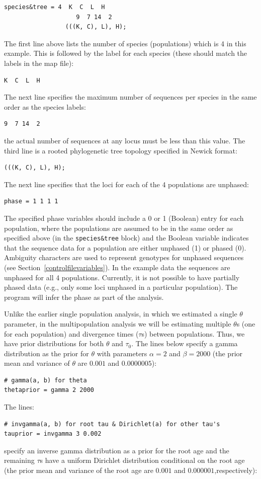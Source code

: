 \documentclass[a4paper]{book}
\numberwithin{equation}{section} \renewcommand{\baselinestretch}{0.55}
\begin{document}
\begin{verbatim}
species&tree = 4  K  C  L  H
                    9  7 14  2
                 (((K, C), L), H);
\end{verbatim}

\noindent
The first line above lists the number of species (populations) which is
4 in this example. This is followed
by the label for each species (these should match the labels in the map
file):
\begin{verbatim}
K  C  L  H
\end{verbatim}
The next line specifies the maximum number of sequences per
species in the same order as the species labels:
\begin{verbatim}
9  7 14  2
\end{verbatim}
the actual number of sequences at any locus must be less than this value.
The third line is a rooted phylogenetic tree topology specified in
Newick format:
\begin{verbatim}
(((K, C), L), H);
\end{verbatim}
The next line specifies that the loci for each of the 4 populations
are unphased:
\begin{verbatim}
phase = 1 1 1 1
\end{verbatim}
The specified phase variables should include a 0 or 1 (Boolean) entry for each population, 
where the populations are assumed to be in the same order as specified above
(in the \texttt{species\&tree} block)
and the Boolean variable indicates that the sequence data for a population
are either unphased (1) or phased (0). Ambiguity characters are used to represent
genotypes for unphased sequences (see Section~\ref{controlfilevariables}).
In the example data the sequences are unphased for all 4 populations.
Currently, it is not possible to have partially phased data (e.g., only
some loci unphased in a particular population). The program will infer
the phase as part of the analysis.

Unlike the earlier single population analysis, in which we estimated a
single $\theta$ parameter, in the multipopulation analysis we will be
estimating multiple $\theta$s (one for each population) and divergence
times ($\tau$s) between populations. Thus, we have prior distributions
for both $\theta$ and $\tau_0$. The lines below specify a gamma distribution
as the prior for $\theta$ with parameters $\alpha = 2$ and $\beta = 2000$
(the prior mean and variance of $\theta$ are $0.001$ and $0.0000005$):
\begin{verbatim}
# gamma(a, b) for theta
thetaprior = gamma 2 2000 
\end{verbatim}
The lines:
\begin{verbatim}
# invgamma(a, b) for root tau & Dirichlet(a) for other tau's
tauprior = invgamma 3 0.002 
\end{verbatim}
specify an inverse gamma distribution as a prior for
the root age and the remaining $\tau$s have a uniform Dirichlet
distribution conditional on the root age (the prior mean and variance of the
root age are $0.001$ and $0.000001$,respectively):
\end{document}
